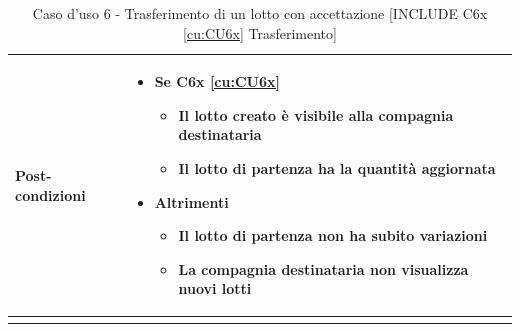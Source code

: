 \documentclass[a4paper,11pt]{article}
\begin{document}
\begin{longtable}{|m{2cm}|m{10.5cm}|}
  \\ \hline
  \textbf{Post-condizioni} &
  \begin{itemize}
    \item Se C6x \ref{cu:CU6x}
          \begin{itemize}
            \item Il lotto creato è visibile alla compagnia destinataria
            \item Il lotto di partenza ha la quantità aggiornata
          \end{itemize}
    \item Altrimenti
          \begin{itemize}
            \item Il lotto di partenza non ha subito variazioni
            \item La compagnia destinataria non visualizza nuovi lotti
          \end{itemize}
  \end{itemize}
  \\ \hline
  \caption{Caso d'uso 6 - Trasferimento di un lotto con accettazione [INCLUDE C6x \ref{cu:CU6x} Trasferimento]}
  \label{cu:CU6}
\end{longtable}
\end{document}
